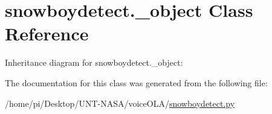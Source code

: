 \hypertarget{classsnowboydetect_1_1__object}{}\section{snowboydetect.\+\_\+object Class Reference}
\label{classsnowboydetect_1_1__object}


Inheritance diagram for snowboydetect.\+\_\+object\+:


The documentation for this class was generated from the following file\+:\begin{DoxyCompactItemize}
\item 
/home/pi/\+Desktop/\+U\+N\+T-\/\+N\+A\+S\+A/voice\+O\+L\+A/\hyperlink{snowboydetect_8py}{snowboydetect.\+py}\end{DoxyCompactItemize}

